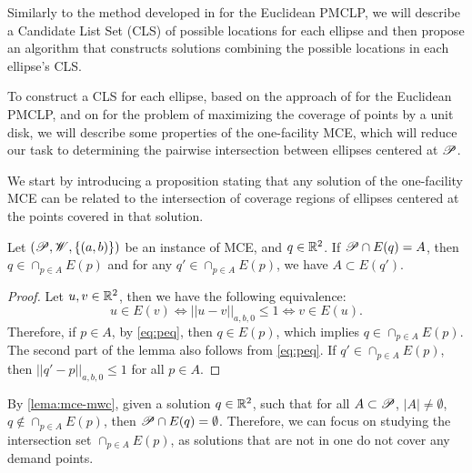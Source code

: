 Similarly to the method developed in \cite{church:1984} for the Euclidean PMCLP, we will describe a Candidate List Set (CLS) of possible locations for each ellipse and then propose an algorithm that constructs solutions combining the possible locations in each ellipse's CLS.

To construct a CLS for each ellipse, based on the approach of \cite{church:1984} for the Euclidean PMCLP, and on \cite{chazelle:1986} for the problem of maximizing the coverage of points by a unit disk, we will describe some properties of the one-facility MCE, which will reduce our task to determining the pairwise intersection between ellipses centered at $\mathscr{P}$.


We start by introducing a proposition stating that any solution of the one-facility MCE can be related to the intersection of coverage regions of ellipses centered at the points covered in that solution.

\begin{prp}\label{lema:mce-mwc}
	Let $(\mathscr{P}, \mathscr{W}, \{(a, b)\})$ be an instance of MCE, and $q\in \mathbb{R}^2$. If $\mathscr{P} \cap E(q) = A$, then $q \in \cap_{p\in A} E(p)$ and for any $q' \in \cap_{p\in A} E(p)$, we have $A \subset E(q')$.
\end{prp}
\begin{proof}
	Let $u, v \in \mathbb{R}^2$, then we have the following equivalence:
	\begin{equation}\label{eq:peq}
	u \in E(v) \Leftrightarrow ||u-v||_{a, b, 0} \le 1 \Leftrightarrow v \in E(u).
	\end{equation}
	Therefore, if $p\in A$, by \autoref{eq:peq}, then $q \in E(p)$, which implies $q \in \cap_{p\in A} E(p)$.
	The second part of the lemma also follows from \autoref{eq:peq}. If $q' \in \cap_{p\in A} E(p)$, then $||q' - p||_{a,b,0} \le 1$ for all $p \in A$.
\end{proof}

By \autoref{lema:mce-mwc}, given a solution $q\in\mathbb{R}^2$, such that for all $A \subset \mathscr{P}$, $|A|\neq \emptyset$, $q \not \in \cap_{p\in A} E(p)$, then $\mathscr{P} \cap E(q) = \emptyset$. Therefore, we can focus on studying the intersection set $\cap_{p\in A} E(p)$, as solutions that are not in one do not cover any demand points.

